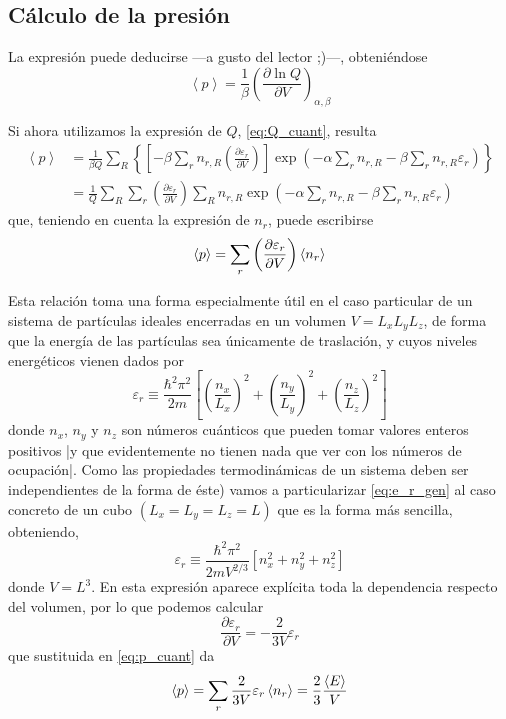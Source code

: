 \subsection*{Cálculo de la presión}

La expresión puede deducirse ---a gusto del lector ;)---, obteniéndose
\begin{equation}
	\left\langle p \right\rangle = \frac{1}{\beta} \left( \frac{\partial \ln Q}{\partial V} \right)_{\alpha, \beta}
\end{equation}

Si ahora utilizamos la expresión de $Q$, \eqref{eq:Q_cuant}, resulta
\begin{align*}
	\left\langle p \right\rangle &= \frac{1}{\beta Q} \sum_R \left\lbrace \left[ -\beta \sum_r n_{r,R} \left( \frac{\partial \varepsilon_r}{\partial V} \right) \right] \exp \left( -\alpha \sum_r n_{r,R} -\beta \sum_r n_{r,R} \varepsilon_r \right)  \right\rbrace \\
	&= \frac{1}{Q} \sum_R  \sum_r \left( \frac{\partial \varepsilon_r}{\partial V} \right) \sum_R n_{r,R} \exp \left( -\alpha \sum_r n_{r,R} -\beta \sum_r n_{r,R} \varepsilon_r \right)
\end{align*}
que, teniendo en cuenta la expresión de $n_r$, puede escribirse
\begin{equation}\label{eq:p_cuant}
	\left\langle p \right\rangle = \sum_r \left( \frac{\partial \varepsilon_r}{\partial V} \right) \expval{n_r} 
\end{equation}

Esta relación toma una forma especialmente útil en el caso particular de un sistema de partículas ideales encerradas en un volumen $V = L_xL_yL_z$, de forma que la energía de las partículas sea únicamente de traslación, y cuyos niveles energéticos vienen dados por
\begin{equation}\label{eq:e_r_gen}
	\varepsilon_r \equiv \frac{\hbar^2 \pi^2}{2m} \left[\left( \frac{n_x}{L_x} \right)^2 + \left( \frac{n_y}{L_y} \right)^2 + \left( \frac{n_z}{L_z} \right)^2 \right] 
\end{equation}
donde $n_x$, $n_y$ y $n_z$ son números cuánticos que pueden tomar valores enteros positivos |y que evidentemente no tienen nada que ver con los números de ocupación|.
Como las propiedades termodinámicas de un sistema deben ser independientes de la forma de éste) vamos a particularizar \eqref{eq:e_r_gen} al caso concreto de un cubo $(L_x = L_y = L_z = L)$ que es la forma más sencilla, obteniendo,
\begin{equation}
\varepsilon_r \equiv \frac{\hbar^2 \pi^2}{2mV^{2/3}} \left[ n_x^2 + n_y^2 + n_z^2 \right] 
\end{equation}
donde $V = L^3$.
En esta expresión aparece explícita toda la dependencia respecto del volumen, por lo que podemos calcular
$$\frac{\partial \varepsilon_r}{\partial V} = - \frac{2}{3 V} \varepsilon_r$$
que sustituida en \eqref{eq:p_cuant} da
\begin{equation}\label{eq:pv_t6}
	\left\langle p \right\rangle = \sum_r \frac{2}{3 V} \varepsilon_r \expval{n_r} = \frac{2}{3} \frac{\left\langle E \right\rangle}{V}
\end{equation}

